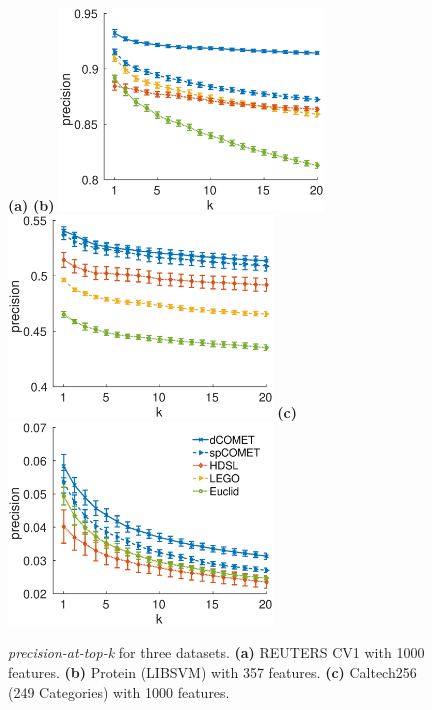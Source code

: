 \documentclass[twoside,11pt]{article}
\begin{document}
\begin{figure}[ht]
{
  \centering
  {\bf(a)} \hspace{170pt} {\bf(b)} \hspace{190pt} \newline\newline
  \includegraphics[width=7cm]{precision@k_rcv1_4_ig1000}
  \includegraphics[width=7cm]{precision@k_protein}
  \newline
  {\bf (c)} \hspace{140pt}  \newline
  \includegraphics[width=7cm]{precision@k_Caltech256_with_249Categories}
  \caption{\textit{precision-at-top-k} for three datasets. {\bf (a)} REUTERS CV1 with 1000 features. {\bf (b)} Protein (LIBSVM) with 357 features. {\bf (c)} Caltech256 (249 Categories) with 1000 features.}
}
\end{figure}



\vskip 0.2in
\clearpage 

\end{document}
